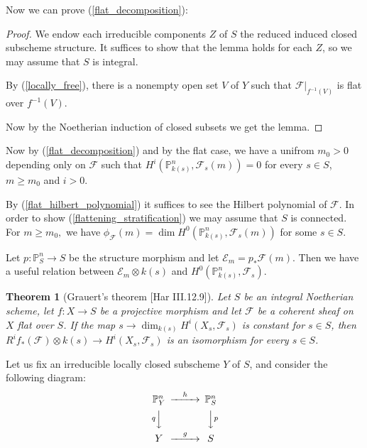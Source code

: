 \documentclass{article}
\theoremstyle{theorem}
\newtheorem{theorem}{Theorem}[section]
\begin{document}
    Now we can prove (\ref{flat_decomposition}):
    
    \begin{proof}
        We endow each irreducible components $Z$ of $S$ the reduced induced closed subscheme structure. It suffices to show that the lemma holds for each $Z$, so we may assume that $S$ is integral.
        
        By (\ref{locally_free}), there is a nonempty open set $V$ of $Y$ such that $\mathcal F|_{f^{-1}(V)}$ is flat over $f^{-1}(V)$.
        
        Now by the Noetherian induction of closed subsets we get the lemma.
    \end{proof}
    
    Now by (\ref{flat_decomposition}) and by the flat case, we have a unifrom $m_0 > 0$ depending only on $\mathcal F$ such that $H^i(\mathbb P^n_{k(s)}, \mathcal F_s(m)) = 0$ for every $s \in S$, $m \geq m_0$ and $i > 0$.
    
    By (\ref{flat_hilbert_polynomial}) it suffices to see the Hilbert polynomial of $\mathcal F$. In order to show (\ref{flattening_stratification}) we may assume that $S$ is connected. For $m \geq m_0,$ we have $\phi_{\mathcal F}(m) = \dim H^0(\mathbb P^n_{k(s)}, \mathcal F_s(m))$ for some $s \in S.$
    
    Let $p : \mathbb P^n_S \rightarrow S$ be the structure morphism and let $\mathcal E_m = p_* \mathcal F(m).$ Then we have a useful relation between $\mathcal E_m \otimes k(s)$ and $H^0(\mathbb P^n_{k(s)}, \mathcal F_s).$
    
    \begin{theorem} [Grauert's theorem {[Har III.12.9]}] \label{Grauert_theorem}
        Let $S$ be an integral Noetherian scheme, let $f : X \rightarrow S$ be a projective morphism and let $\mathcal F$ be a coherent sheaf on $X$ flat over $S$. If the map $s \rightarrow \dim_{k(s)} H^i(X_s, \mathcal F_s)$ is constant for $s \in S$, then $R^if_*(\mathcal F) \otimes k(s) \rightarrow H^i(X_s, \mathcal F_s)$ is an isomorphism for every $s \in S$.
    \end{theorem}
    
    Let us fix an irreducible locally closed subscheme $Y$ of $S$, and consider the following diagram:
    \[
      \begin{CD}
         \mathbb  P^n_Y @>{h}>> \mathbb  P^n_S \\
      @V{q}VV    @VV{p}V \\
         Y   @>{g}>>  S
      \end{CD}
    \]
    \newline
    
\end{document}
